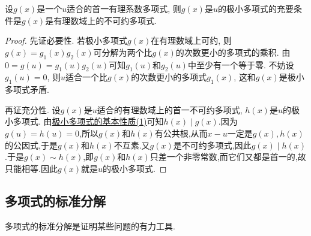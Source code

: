 \documentclass[../../main.tex]{subfiles}
\begin{document}
\begin{proposition}[极小多项式式的充要条件]\label{proposition:极小多项式式的充要条件}
设\(g(x)\)是一个\(u\)适合的首一有理系数多项式, 则\(g(x)\)是\(u\)的极小多项式的充要条件是\(g(x)\)是有理数域上的不可约多项式.
\end{proposition}
\begin{proof}
先证必要性. 若极小多项式\(g(x)\)在有理数域上可约, 则\(g(x)=g_1(x)g_2(x)\)可分解为两个比\(g(x)\)的次数更小的多项式的乘积. 由\(0 = g(u)=g_1(u)g_2(u)\)可知\(g_1(u)\)和\(g_2(u)\)中至少有一个等于零. 不妨设\(g_1(u)=0\), 则\(u\)适合一个比\(g(x)\)的次数更小的多项式\(g_1(x)\), 这和\(g(x)\)是极小多项式矛盾. 

再证充分性. 设\(g(x)\)是\(u\)适合的有理数域上的首一不可约多项式, \(h(x)\)是\(u\)的极小多项式. 由\hyperref[proposition:极小多项式的基本性质]{极小多项式的基本性质(1)}可知\(h(x)\mid g(x)\).因为$g(u)=h(u)=0$,所以$g(x)$和$h(x)$有公共根,从而$x-u$一定是$g(x),h(x)$的公因式,于是$g(x)$和$h(x)$不互素.又\(g(x)\)是不可约多项式,因此$g(x)\mid h(x)$.于是$g(x)\sim h(x)$,即\(g(x)\)和\(h(x)\)只差一个非零常数,而它们又都是首一的,故只能相等.因此\(g(x)\)就是\(u\)的极小多项式.
\end{proof}

\subsection{多项式的标准分解}

多项式的标准分解是证明某些问题的有力工具.
\end{document}
